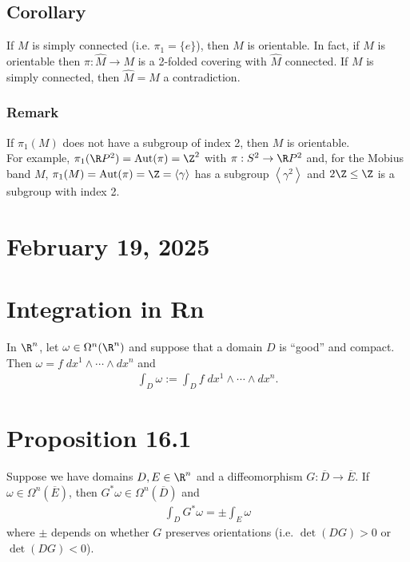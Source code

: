 \documentclass[11pt]{article}
\begin{document}
\subsection*{Corollary}
\label{sec:org0f7ad59}
If \(M\) is simply connected (i.e. \(\pi_{1}=\{e\}\)), then \(M\) is orientable. In fact, if \(M\) is orientable then \(\pi:\hat{M}\to M\) is a 2-folded covering with \(\hat{M}\) connected. If \(M\) is simply connected, then \(\hat{M}=M\) a contradiction.\\
\subsubsection*{Remark}
\label{sec:org6d6a557}
If \(\pi_{1}(M)\) does not have a subgroup of index 2, then \(M\) is orientable.\\
For example, \(\pi_{1}(\R P^{2})=\operatorname{Aut}(\pi)=\Z^{2}\) with \(\pi:S^{2}\to\R P^{2}\) and, for the Mobius band \(M\), \(\pi_{1}(M)=\operatorname{Aut}(\pi)=\Z=\left\langle \gamma \right\rangle\) has a subgroup \(\left\langle \gamma^{2} \right\rangle\) and \(2\Z\leq \Z\) is a subgroup with index 2.\\
\section*{February 19, 2025}
\label{sec:org9a26449}
\section*{Integration in Rn}
\label{sec:orge25db4c}
In \(\R^{n}\), let \(\omega\in\Omega^{n}(\R^{n})\) and suppose that a domain \(D\) is ``good'' and compact. Then \(\omega=f\;dx^{1}\wedge\cdots\wedge dx^{n}\) and\\
\begin{align*}
  \int_{D}\omega
  :=\int_{D}f\;dx^{1}\wedge\cdots\wedge dx^{n}.
\end{align*}
\section*{Proposition 16.1}
\label{sec:org9423f6d}
Suppose we have domains \(D,E\in\R^{n}\) and a diffeomorphism \(G:\overline{D}\to\overline{E}\). If \(\omega\in\Omega^{n}(\overline{E})\), then \(G^{*}\omega\in\Omega^{n}(\overline{D})\) and\\
\begin{align*}
  \int_{D}G^{*}\omega=\pm\int_{E}\omega
\end{align*}
where \(\pm\) depends on whether \(G\) preserves orientations (i.e. \(\det(DG)>0\) or \(\det(DG)<0\)).\\
\end{document}

